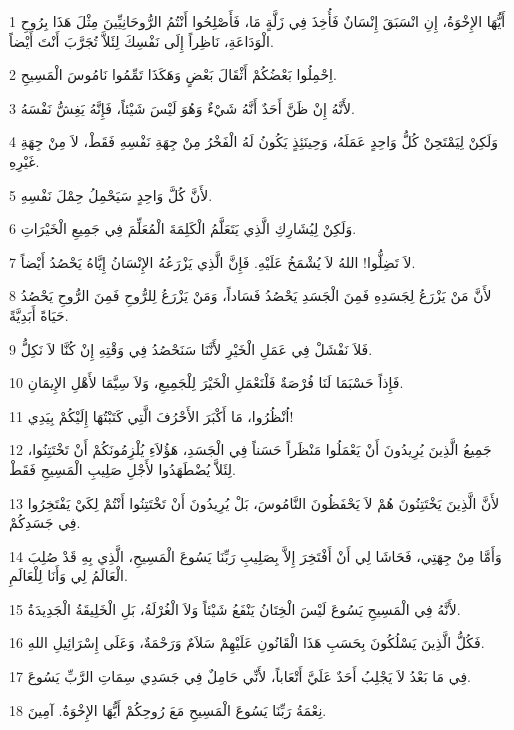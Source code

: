 \par 1 أَيُّهَا الإِخْوَةُ، إِنِ انْسَبَقَ إِنْسَانٌ فَأُخِذَ فِي زَلَّةٍ مَا، فَأَصْلِحُوا أَنْتُمُ الرُّوحَانِيِّينَ مِثْلَ هَذَا بِرُوحِ الْوَدَاعَةِ، نَاظِراً إِلَى نَفْسِكَ لِئَلاَّ تُجَرَّبَ أَنْتَ أَيْضاً.
\par 2 اِحْمِلُوا بَعْضُكُمْ أَثْقَالَ بَعْضٍ وَهَكَذَا تَمِّمُوا نَامُوسَ الْمَسِيحِ.
\par 3 لأَنَّهُ إِنْ ظَنَّ أَحَدٌ أَنَّهُ شَيْءٌ وَهُوَ لَيْسَ شَيْئاً، فَإِنَّهُ يَغِشُّ نَفْسَهُ.
\par 4 وَلَكِنْ لِيَمْتَحِنْ كُلُّ وَاحِدٍ عَمَلَهُ، وَحِينَئِذٍ يَكُونُ لَهُ الْفَخْرُ مِنْ جِهَةِ نَفْسِهِ فَقَطْ، لاَ مِنْ جِهَةِ غَيْرِهِ.
\par 5 لأَنَّ كُلَّ وَاحِدٍ سَيَحْمِلُ حِمْلَ نَفْسِهِ.
\par 6 وَلَكِنْ لِيُشَارِكِ الَّذِي يَتَعَلَّمُ الْكَلِمَةَ الْمُعَلِّمَ فِي جَمِيعِ الْخَيْرَاتِ.
\par 7 لاَ تَضِلُّوا! اللهُ لاَ يُشْمَخُ عَلَيْهِ. فَإِنَّ الَّذِي يَزْرَعُهُ الإِنْسَانُ إِيَّاهُ يَحْصُدُ أَيْضاً.
\par 8 لأَنَّ مَنْ يَزْرَعُ لِجَسَدِهِ فَمِنَ الْجَسَدِ يَحْصُدُ فَسَاداً، وَمَنْ يَزْرَعُ لِلرُّوحِ فَمِنَ الرُّوحِ يَحْصُدُ حَيَاةً أَبَدِيَّةً.
\par 9 فَلاَ نَفْشَلْ فِي عَمَلِ الْخَيْرِ لأَنَّنَا سَنَحْصُدُ فِي وَقْتِهِ إِنْ كُنَّا لاَ نَكِلُّ.
\par 10 فَإِذاً حَسْبَمَا لَنَا فُرْصَةٌ فَلْنَعْمَلِ الْخَيْرَ لِلْجَمِيعِ، وَلاَ سِيَّمَا لأَهْلِ الإِيمَانِ.
\par 11 اُنْظُرُوا، مَا أَكْبَرَ الأَحْرُفَ الَّتِي كَتَبْتُهَا إِلَيْكُمْ بِيَدِي!
\par 12 جَمِيعُ الَّذِينَ يُرِيدُونَ أَنْ يَعْمَلُوا مَنْظَراً حَسَناً فِي الْجَسَدِ، هَؤُلاَءِ يُلْزِمُونَكُمْ أَنْ تَخْتَتِنُوا، لِئَلاَّ يُضْطَهَدُوا لأَجْلِ صَلِيبِ الْمَسِيحِ فَقَطْ.
\par 13 لأَنَّ الَّذِينَ يَخْتَتِنُونَ هُمْ لاَ يَحْفَظُونَ النَّامُوسَ، بَلْ يُرِيدُونَ أَنْ تَخْتَتِنُوا أَنْتُمْ لِكَيْ يَفْتَخِرُوا فِي جَسَدِكُمْ.
\par 14 وَأَمَّا مِنْ جِهَتِي، فَحَاشَا لِي أَنْ أَفْتَخِرَ إِلاَّ بِصَلِيبِ رَبِّنَا يَسُوعَ الْمَسِيحِ، الَّذِي بِهِ قَدْ صُلِبَ الْعَالَمُ لِي وَأَنَا لِلْعَالَمِ.
\par 15 لأَنَّهُ فِي الْمَسِيحِ يَسُوعَ لَيْسَ الْخِتَانُ يَنْفَعُ شَيْئاً وَلاَ الْغُرْلَةُ، بَلِ الْخَلِيقَةُ الْجَدِيدَةُ.
\par 16 فَكُلُّ الَّذِينَ يَسْلُكُونَ بِحَسَبِ هَذَا الْقَانُونِ عَلَيْهِمْ سَلاَمٌ وَرَحْمَةٌ، وَعَلَى إِسْرَائِيلِ اللهِ.
\par 17 فِي مَا بَعْدُ لاَ يَجْلِبُ أَحَدٌ عَلَيَّ أَتْعَاباً، لأَنِّي حَامِلٌ فِي جَسَدِي سِمَاتِ الرَّبِّ يَسُوعَ.
\par 18 نِعْمَةُ رَبِّنَا يَسُوعَ الْمَسِيحِ مَعَ رُوحِكُمْ أَيُّهَا الإِخْوَةُ. آمِينَ.

